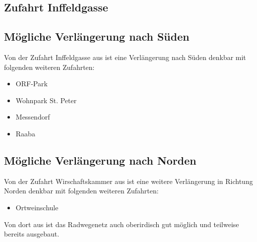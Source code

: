 \subsection{Zufahrt Inffeldgasse}

\subsection{Mögliche Verlängerung nach Süden}
Von der Zufahrt Inffeldgasse aus ist eine Verlängerung nach Süden denkbar mit folgenden weiteren Zufahrten:
\begin{itemize}
    \item ORF-Park
    \item Wohnpark St. Peter
    \item Messendorf
    \item Raaba
\end{itemize}

\subsection{Mögliche Verlängerung nach Norden}
Von der Zufahrt Wirschaftskammer aus ist eine weitere Verlängerung in Richtung Norden denkbar mit folgenden weiteren Zufahrten:
\begin{itemize}
    \item Ortweinschule
\end{itemize}

Von dort aus ist das Radwegenetz auch oberirdisch gut möglich und teilweise bereits ausgebaut.